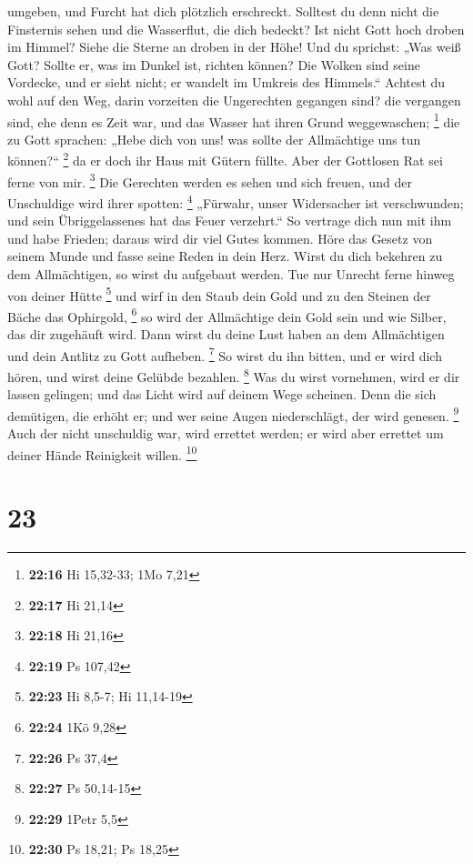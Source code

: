 umgeben, und Furcht hat dich plötzlich erschreckt. 
Solltest du denn nicht die Finsternis sehen und die Wasserflut, die dich
bedeckt?  Ist nicht Gott hoch droben im Himmel? Siehe die
Sterne an droben in der Höhe!  Und du sprichst: „Was weiß
Gott? Sollte er, was im Dunkel ist, richten können?  Die
Wolken sind seine Vordecke, und er sieht nicht; er wandelt im Umkreis
des Himmels.``  Achtest du wohl auf den Weg, darin
vorzeiten die Ungerechten gegangen sind?  die vergangen
sind, ehe denn es Zeit war, und das Wasser hat ihren Grund weggewaschen;
\footnote{\textbf{22:16} Hi 15,32-33; 1Mo 7,21}  die zu
Gott sprachen: „Hebe dich von uns! was sollte der Allmächtige uns tun
können?{}`` \footnote{\textbf{22:17} Hi 21,14}  da er
doch ihr Haus mit Gütern füllte. Aber der Gottlosen Rat sei ferne von
mir. \footnote{\textbf{22:18} Hi 21,16}  Die Gerechten
werden es sehen und sich freuen, und der Unschuldige wird ihrer spotten:
\footnote{\textbf{22:19} Ps 107,42}  „Fürwahr, unser
Widersacher ist verschwunden; und sein Übriggelassenes hat das Feuer
verzehrt.``  So vertrage dich nun mit ihm und habe
Frieden; daraus wird dir viel Gutes kommen.  Höre das
Gesetz von seinem Munde und fasse seine Reden in dein Herz.
 Wirst du dich bekehren zu dem Allmächtigen, so wirst du
aufgebaut werden. Tue nur Unrecht ferne hinweg von deiner Hütte
\footnote{\textbf{22:23} Hi 8,5-7; Hi 11,14-19}  und wirf
in den Staub dein Gold und zu den Steinen der Bäche das Ophirgold,
\footnote{\textbf{22:24} 1Kö 9,28}  so wird der
Allmächtige dein Gold sein und wie Silber, das dir zugehäuft wird.
 Dann wirst du deine Lust haben an dem Allmächtigen und
dein Antlitz zu Gott aufheben. \footnote{\textbf{22:26} Ps 37,4}
 So wirst du ihn bitten, und er wird dich hören, und
wirst deine Gelübde bezahlen. \footnote{\textbf{22:27} Ps 50,14-15}
 Was du wirst vornehmen, wird er dir lassen gelingen; und
das Licht wird auf deinem Wege scheinen.  Denn die sich
demütigen, die erhöht er; und wer seine Augen niederschlägt, der wird
genesen. \footnote{\textbf{22:29} 1Petr 5,5}  Auch der
nicht unschuldig war, wird errettet werden; er wird aber errettet um
deiner Hände Reinigkeit willen. \footnote{\textbf{22:30} Ps 18,21; Ps
  18,25}

\hypertarget{section-5}{%
\section{23}\label{section-5}}

